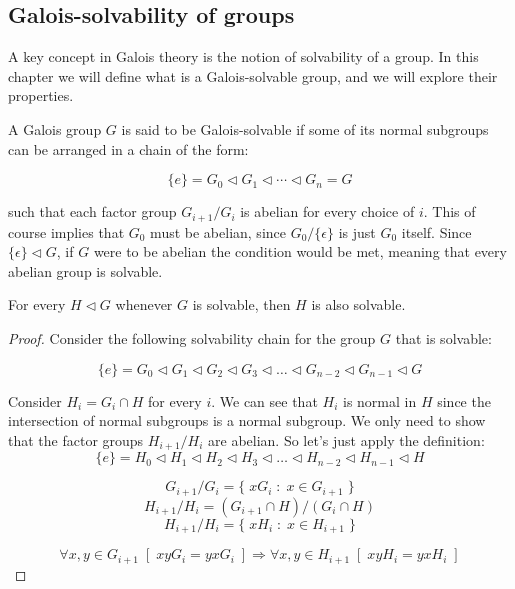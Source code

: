 \subsection{Galois-solvability of groups}
A key concept in Galois theory is the notion of solvability of a group. In this 
chapter we will define what is a Galois-solvable group, and we will explore their 
properties. 

\begin{definition}
    A Galois group $G$ is said to be Galois-solvable if some of its normal subgroups 
    can be arranged in a chain of the form:
    
    $$ \{e\} = G_0 \triangleleft G_1 \triangleleft \cdots \triangleleft G_n = G $$
    \vspace{0.1em}

    such that each factor group $G_{i+1}/G_i$ is abelian for every choice of $i$. This of 
    course implies that $G_0$ must be abelian, since $G_0/\{\epsilon\}$ is just $G_0$ itself. 
    Since $\{ \epsilon \}\triangleleft G$, if $G$ were to be abelian the condition would 
    be met, meaning that every abelian group is solvable. \\
\end{definition} \vspace{0.2em}

\begin{lemma}
\label{lem:solvableNormalSubgroup}
    For every $H \triangleleft G$ whenever $G$ is solvable, then $H$ is also solvable.
\end{lemma}
\begin{proof}
    Consider the following solvability chain for the group $G$ that is solvable:

    $$ \{e\} = G_0 \triangleleft G_1 \triangleleft G_2
    \triangleleft G_3 \triangleleft \dots \triangleleft G_{n-2} \triangleleft 
    G_{n-1}  \triangleleft G $$
    \vspace{0.1em}

    Consider $H_i = G_i \cap H$ for every $i$. We can see that $H_i$ is normal in $H$ since
    the intersection of normal subgroups is a normal subgroup. We only need to show that 
    the factor groups $H_{i+1}/H_i$ are abelian. So let's just apply the definition: \\
 
    $$ \{e\} = H_0 \triangleleft H_1 \triangleleft H_2
    \triangleleft H_3 \triangleleft \dots \triangleleft H_{n-2} \triangleleft 
    H_{n-1}  \triangleleft H $$

    $$ G_{i+1}/G_i = \{\; xG_i \;:\; x \in G_{i+1} \;\} $$
    $$ H_{i+1}/H_i = (G_{i+1} \cap H)/(G_i \cap H) $$
    $$ H_{i+1}/H_i = \{\; xH_i \;:\; x \in H_{i+1} \;\} $$
    
    $$ \forall x,y \in G_{i+1} \;[\;xyG_i = yxG_i \;] \Rightarrow \forall x,y 
    \in H_{i+1} \;[\;xyH_i = yxH_i \;] $$
    \vspace{0.1em}

\end{proof}

